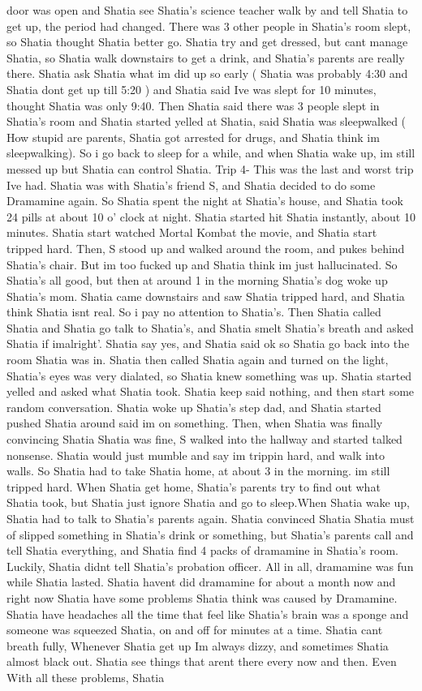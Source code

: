 \documentclass[12pt]{book}
\begin{document}
door was open and Shatia see Shatia's science teacher walk by and tell Shatia to get up, the period had changed. There was 3 other people in Shatia's room slept, so Shatia thought Shatia better go. Shatia try and get dressed, but cant manage Shatia, so Shatia walk downstairs to get a drink, and Shatia's parents are really there. Shatia ask Shatia what im did up so early ( Shatia was probably 4:30 and Shatia dont get up till 5:20 ) and Shatia said Ive was slept for 10 minutes, thought Shatia was only 9:40. Then Shatia said there was 3 people slept in Shatia's room and Shatia started yelled at Shatia, said Shatia was sleepwalked ( How stupid are parents, Shatia got arrested for drugs, and Shatia think im sleepwalking). So i go back to sleep for a while, and when Shatia wake up, im still messed up but Shatia can control Shatia. Trip 4- This was the last and worst trip Ive had. Shatia was with Shatia's friend S, and Shatia decided to do some Dramamine again. So Shatia spent the night at Shatia's house, and Shatia took 24 pills at about 10 o' clock at night. Shatia started hit Shatia instantly, about 10 minutes. Shatia start watched Mortal Kombat the movie, and Shatia start tripped hard. Then, S stood up and walked around the room, and pukes behind Shatia's chair. But im too fucked up and Shatia think im just hallucinated. So Shatia's all good, but then at around 1 in the morning Shatia's dog woke up Shatia's mom. Shatia came downstairs and saw Shatia tripped hard, and Shatia think Shatia isnt real. So i pay no attention to Shatia's. Then Shatia called Shatia and Shatia go talk to Shatia's, and Shatia smelt Shatia's breath and asked Shatia if imalright'. Shatia say yes, and Shatia said ok so Shatia go back into the room Shatia was in. Shatia then called Shatia again and turned on the light, Shatia's eyes was very dialated, so Shatia knew something was up. Shatia started yelled and asked what Shatia took. Shatia keep said nothing, and then start some random conversation. Shatia woke up Shatia's step dad, and Shatia started pushed Shatia around said im on something. Then, when Shatia was finally convincing Shatia Shatia was fine, S walked into the hallway and started talked nonsense. Shatia would just mumble and say im trippin hard, and walk into walls. So Shatia had to take Shatia home, at about 3 in the morning. im still tripped hard. When Shatia get home, Shatia's parents try to find out what Shatia took, but Shatia just ignore Shatia and go to sleep.When Shatia wake up, Shatia had to talk to Shatia's parents again. Shatia convinced Shatia Shatia must of slipped something in Shatia's drink or something, but Shatia's parents call and tell Shatia everything, and Shatia find 4 packs of dramamine in Shatia's room. Luckily, Shatia didnt tell Shatia's probation officer. All in all, dramamine was fun while Shatia lasted. Shatia havent did dramamine for about a month now and right now Shatia have some problems Shatia think was caused by Dramamine. Shatia have headaches all the time that feel like Shatia's brain was a sponge and someone was squeezed Shatia, on and off for minutes at a time. Shatia cant breath fully, Whenever Shatia get up Im always dizzy, and sometimes Shatia almost black out. Shatia see things that arent there every now and then. Even With all these problems, Shatia 
\end{document}
